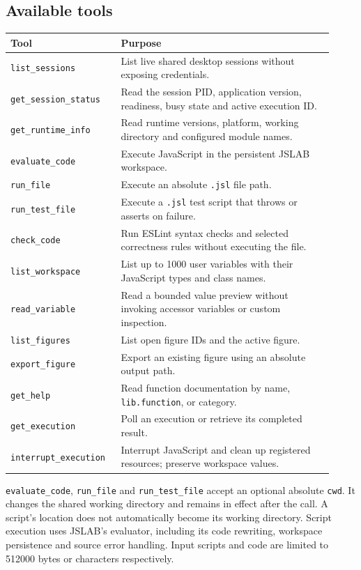 \documentclass[12pt,a4paper]{article}
\begin{document}
\subsection{Available tools}

\begin{longtable}{p{0.30\linewidth}p{0.62\linewidth}}
\hline
Tool & Purpose \\
\hline
\texttt{list\_sessions} & List live shared desktop sessions without exposing credentials. \\
\texttt{get\_session\_status} & Read the session PID, application version, readiness, busy state and active execution ID. \\
\texttt{get\_runtime\_info} & Read runtime versions, platform, working directory and configured module names. \\
\texttt{evaluate\_code} & Execute JavaScript in the persistent JSLAB workspace. \\
\texttt{run\_file} & Execute an absolute \texttt{.jsl} file path. \\
\texttt{run\_test\_file} & Execute a \texttt{.jsl} test script that throws or asserts on failure. \\
\texttt{check\_code} & Run ESLint syntax checks and selected correctness rules without executing the file. \\
\texttt{list\_workspace} & List up to 1000 user variables with their JavaScript types and class names. \\
\texttt{read\_variable} & Read a bounded value preview without invoking accessor variables or custom inspection. \\
\texttt{list\_figures} & List open figure IDs and the active figure. \\
\texttt{export\_figure} & Export an existing figure using an absolute output path. \\
\texttt{get\_help} & Read function documentation by name, \texttt{lib.function}, or category. \\
\texttt{get\_execution} & Poll an execution or retrieve its completed result. \\
\texttt{interrupt\_execution} & Interrupt JavaScript and clean up registered resources; preserve workspace values. \\
\hline
\end{longtable}
\texttt{evaluate\_code}, \texttt{run\_file} and \texttt{run\_test\_file} accept an optional absolute \texttt{cwd}. It changes the shared working directory and remains in effect after the call. A script's location does not automatically become its working directory. Script execution uses JSLAB's evaluator, including its code rewriting, workspace persistence and source error handling. Input scripts and code are limited to 512000 bytes or characters respectively.
\end{document}
